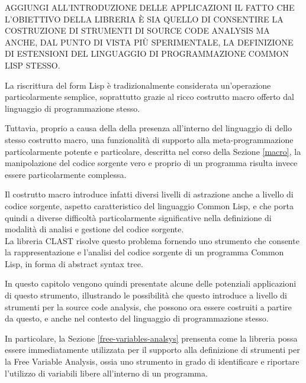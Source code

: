 \documentclass{book}
\begin{document}
AGGIUNGI ALL’INTRODUZIONE DELLE APPLICAZIONI IL FATTO CHE L’OBIETTIVO DELLA
LIBRERIA È SIA QUELLO DI CONSENTIRE LA COSTRUZIONE DI STRUMENTI DI SOURCE CODE
ANALYSIS MA ANCHE, DAL PUNTO DI VISTA PIÙ SPERIMENTALE, LA DEFINIZIONE DI
ESTENSIONI DEL LINGUAGGIO DI PROGRAMMAZIONE COMMON LISP STESSO.

La riscrittura del form Lisp è tradizionalmente considerata un'operazione
particolarmente semplice, soprattutto grazie al ricco costrutto macro offerto
dal linguaggio di programmazione stesso.

Tuttavia, proprio a causa della della presenza all'interno del linguaggio di
dello stesso costrutto macro, una funzionalità di supporto alla
meta-programmazione particolarmente potente e particolare, descritta nel corso
della Sezione \ref{macro}, la manipolazione del codice sorgente vero e proprio
di un programma risulta invece essere particolarmente complessa.

Il costrutto macro introduce infatti diversi livelli di astrazione anche a
livello di codice sorgente, aspetto caratteristico del linguaggio Common Lisp, e
che porta quindi a diverse difficoltà particolarmente significative nella
definizione di modalità di analisi e gestione del codice sorgente.\\


La libreria CLAST risolve questo problema fornendo uno strumento che consente la
rappresentazione e l'analisi del codice sorgente di un programma Common Lisp, in
forma di abstract syntax tree.

In questo capitolo vengono quindi presentate alcune delle potenziali
applicazioni di questo strumento, illustrando le possibilità che questo
introduce a livello di strumenti per la source code analysis, che possono ora
essere costruiti a partire da questo, e anche nel contesto del linguaggio di
programmazione stesso.


In particolare, la Sezione \ref{free-variables-analsys} prensenta come la
libreria possa essere immediatamente utilizzata per il supporto alla definizione
di strumenti per la Free Variable Analysis, ossia uno strumento in grado di
identificare e riportare l'utilizzo di variabili libere all'interno di un
programma.
\end{document}
